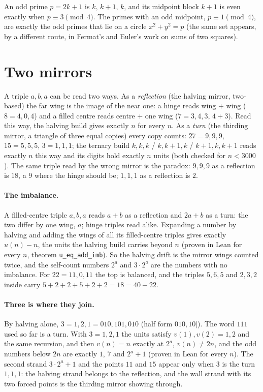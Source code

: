 \documentclass[11pt]{article}
\begin{document}
An odd prime $p = 2k+1$ is $k,\,k{+}1,\,k$, and its midpoint block $k+1$ is even exactly when $p\equiv 3\pmod 4$. The primes with an odd midpoint, $p\equiv1\pmod 4$, are exactly the odd primes that lie on a circle $x^2+y^2 = p$ (the same set appears, by a different route, in Fermat's and Euler's work on sums of two squares).

\section{Two mirrors}
A triple $a,b,a$ can be read two ways. As a \emph{reflection} (the halving mirror, two-based) the far wing is the image of the near one: a hinge reads wing $+$ wing ($8 = 4,0,4$) and a filled centre reads centre $+$ one wing ($7 = 3,4,3$, $4+3$). Read this way, the halving build gives exactly $n$ for every $n$. As a \emph{turn} (the thirding mirror, a triangle of three equal copies) every copy counts: $27 = 9,9,9$, $15 = 5,5,5$, $3 = 1,1,1$; the ternary build $k,k,k$ / $k,k{+}1,k$ / $k{+}1,k,k{+}1$ reads exactly $n$ this way and its digits hold exactly $n$ units (both checked for $n<3000$). The same triple read by the wrong mirror is the paradox: $9,9,9$ as a reflection is $18$, a $9$ where the hinge should be; $1,1,1$ as a reflection is $2$.

\paragraph{The imbalance.} A filled-centre triple $a,b,a$ reads $a+b$ as a reflection and $2a+b$ as a turn: the two differ by one wing, $a$; hinge triples read alike. Expanding a number by halving and adding the wings of all its filled-centre triples gives exactly $u(n)-n$, the units the halving build carries beyond $n$ (proven in Lean for every $n$, theorem \texttt{u\_eq\_add\_imb}). So the halving drift is the mirror wings counted twice, and the self-count numbers $2^a$ and $3\cdot2^a$ are the numbers with no imbalance. For $22 = 11,0,11$ the top is balanced, and the triples $5,6,5$ and $2,3,2$ inside carry $5+2+2+5+2+2 = 18 = 40-22$.

\paragraph{Three is where they join.} By halving alone, $3 = 1,2,1 = 010,101,010$ (half form $010,10|$). The word $111$ used so far is a turn. With $3 = 1,2,1$ the units satisfy $v(1),v(2) = 1,2$ and the same recursion, and then $v(n) = n$ exactly at $2^a$, $v(n)\ne 2n$, and the odd numbers below $2n$ are exactly $1$, $7$ and $2^a+1$ (proven in Lean for every $n$). The second strand $3\cdot2^a+1$ and the points $11$ and $15$ appear only when $3$ is the turn $1,1,1$: the halving strand belongs to the reflection, and the wall strand with its two forced points is the thirding mirror showing through.
\end{document}
